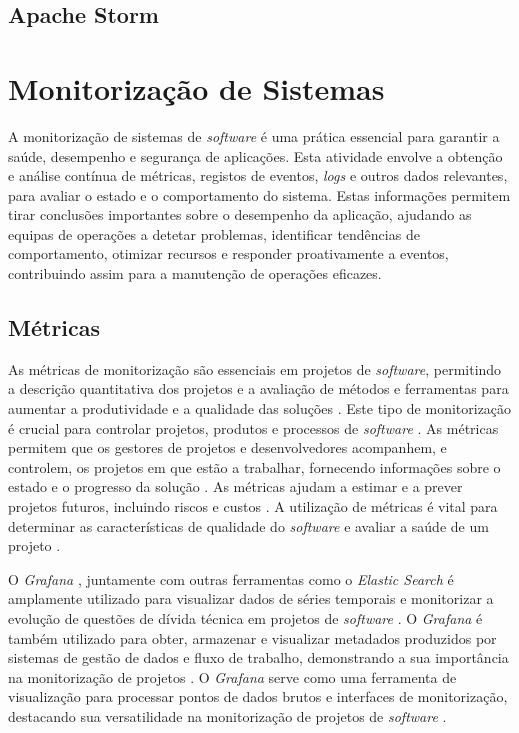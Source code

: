 \subsection{Apache Storm}


\section{Monitorização de Sistemas}

A monitorização de sistemas de \textit{software} é uma prática essencial para garantir a saúde, 
desempenho e segurança de aplicações. Esta atividade envolve a obtenção e análise contínua de métricas, 
registos de eventos, \textit{logs} e outros dados relevantes, para avaliar o estado e o comportamento 
do sistema. Estas informações permitem tirar conclusões importantes sobre o desempenho da aplicação, 
ajudando as equipas de operações a detetar problemas, identificar tendências de comportamento, 
otimizar recursos e responder proativamente a eventos, contribuindo assim para a manutenção de 
operações eficazes.

\subsection{Métricas}

As métricas de monitorização são essenciais em projetos de \textit{software}, permitindo a descrição 
quantitativa dos projetos e a avaliação de métodos e ferramentas para aumentar a produtividade e a 
qualidade das soluções \cite{metrics2003}. Este tipo de monitorização é crucial para controlar 
projetos, produtos e processos de \textit{software} \cite{metrics2019}. As métricas permitem que os 
gestores de projetos e desenvolvedores acompanhem, e controlem, os projetos em que estão a trabalhar,
fornecendo informações sobre o estado e o progresso da solução \cite{metrics2016}. As 
métricas ajudam a estimar e a prever projetos futuros, incluindo riscos e custos 
\cite{metrics2016b}. A utilização de métricas é vital para determinar as características de 
qualidade do \textit{software} e avaliar a saúde de um projeto \cite{metrics2015}.

O \textit{Grafana} \cite{grafana}, juntamente com outras ferramentas como o \textit{Elastic Search}
\cite{elastic-search} é amplamente utilizado para visualizar dados de séries temporais e monitorizar
a evolução de questões de dívida técnica em projetos de \textit{software} \cite{metrics2019b}. O 
\textit{Grafana} é também utilizado para obter, armazenar e visualizar metadados produzidos por 
sistemas de gestão de dados e fluxo de trabalho, demonstrando a sua importância na monitorização 
de projetos \cite{metrics2021}. O \textit{Grafana} serve como uma ferramenta de visualização para 
processar pontos de dados brutos e interfaces de monitorização, destacando sua versatilidade na 
monitorização de projetos de \textit{software} \cite{metrics2022}.

